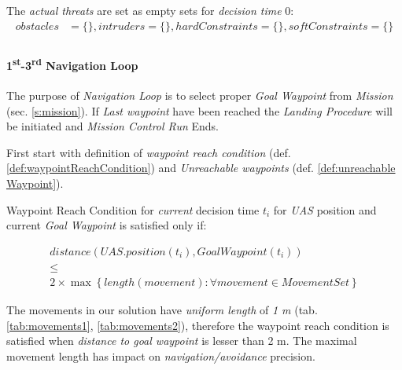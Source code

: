 The \emph{actual threats} are set as empty sets for \emph{decision time} $0$:
\begin{equation}
    \begin{aligned}
    obstacles &= \{\}, intruders = \{\}, hard Constraints = \{\}, soft Constraints = \{\}\\
    \end{aligned}
\end{equation}





\paragraph{1\textsuperscript{st}-3\textsuperscript{rd} Navigation Loop} The purpose of \emph{Navigation Loop} is to select proper \emph{Goal Waypoint} from \emph{Mission} (sec. \ref{s:mission}). If \emph{Last waypoint} have been reached the \emph{Landing Procedure} will be initiated and \emph{Mission Control Run} Ends.

First start with definition of \emph{waypoint reach condition} (def. \ref{def:waypointReachCondition}) and \emph{Unreachable waypoints} (def. \ref{def:unreachable Waypoint}).

\begin{definition}{Waypoint Reach Condition}\label{def:waypointReachCondition} for \emph{current} decision time $t_i$ for \emph{UAS} position and current \emph{Goal Waypoint} is satisfied only if:

\begin{multline}\label{eq:waypointReachCondition}
    distance(UAS.position(t_i),GoalWaypoint(t_i)) \\\le \\2 \times \max \left\{length(movement):\forall movement\in MovementSet\right\}
\end{multline}

    \begin{note}
        The movements in our solution have \emph{uniform length} of \emph{1 m} (tab. \ref{tab:movements1}, \ref{tab:movements2}), therefore the waypoint reach condition is satisfied when \emph{distance to goal waypoint} is lesser than 2 m. The maximal movement length has impact on \emph{navigation/avoidance} precision.
    \end{note}
\end{definition}

